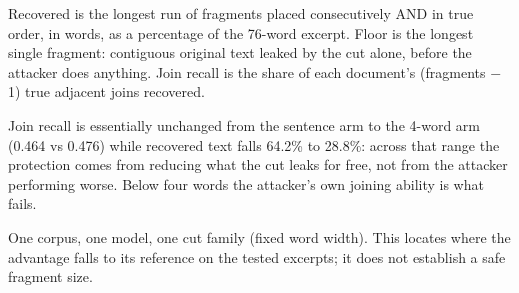 Recovered is the longest run of fragments placed consecutively AND in true order, in words, as a percentage of the 76-word excerpt. Floor is the longest single fragment: contiguous original text leaked by the cut alone, before the attacker does anything. Join recall is the share of each document's (fragments $-$ 1) true adjacent joins recovered.\par
Join recall is essentially unchanged from the sentence arm to the 4-word arm (0.464 vs 0.476) while recovered text falls 64.2\% to 28.8\%: across that range the protection comes from reducing what the cut leaks for free, not from the attacker performing worse. Below four words the attacker's own joining ability is what fails.\par
One corpus, one model, one cut family (fixed word width). This locates where the advantage falls to its reference on the tested excerpts; it does not establish a safe fragment size.\par
\endgroup
\par\addvspace{\intextsep}
